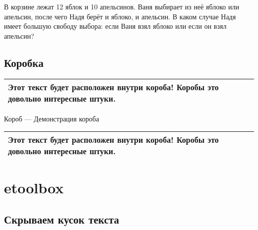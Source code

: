 \documentclass[12pt, a4paper]{article}
\renewcommand{\arraystretch}{1.3} %
\theoremstyle{plain}              %
\theoremstyle{definition}         %
\begin{document}
\begin{exercise}
В корзине лежат 12 яблок и 10 апельсинов. Ваня выбирает из неё яблоко или апельсин, после чего Надя берёт и яблоко, и апельсин. В каком случае Надя имеет большую свободу выбора: если Ваня взял яблоко или если он взял апельсин?
\end{exercise}


\subsection{Коробка} 

\newenvironment{korob}
    {\renewcommand{\arraystretch}{1}
    \begin{center}
    \begin{tabular}{|p{0.9\textwidth}|}
    \hline \vspace{1pt} 
    }{ 
    \vspace{5pt} \\ \hline 
    \end{tabular} 
    \end{center}
    }

 
\begin{korob}
Этот текст будет расположен внутри короба! Коробы это довольно интересные штуки.  
\end{korob}


\newenvironment{korob2}[1]
    {\renewcommand{\arraystretch}{1}
    \begin{center}
    \addtocounter{ikorob}{1} 
    Короб  \arabic{ikorob} --- #1 \\[1ex]
    \begin{tabular}{|p{0.9\textwidth}|}
    \hline \vspace{1pt} 
    }{ 
    \vspace{5pt} \\ \hline 
    \end{tabular} 
    \end{center}
    }
 
\begin{korob2}{Демонстрация короба}
Этот текст будет расположен внутри короба! Коробы это довольно интересные штуки.  
\end{korob2}



\section{etoolbox}
\subsection{Скрываем кусок текста} 
\end{document}
